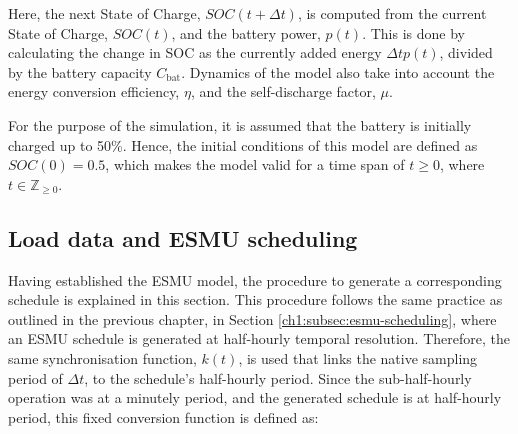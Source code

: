 %
%
%
%
%
%



Here, the next State of Charge, $SOC(t+\Delta t)$, is computed from the current State of Charge, $SOC(t)$, and the battery power, $p(t)$.
This is done by calculating the change in SOC as the currently added energy $\Delta t p(t)$, divided by the battery capacity $C_\text{bat}$.
Dynamics of the model also take into account the energy conversion efficiency, $\eta$, and the self-discharge factor, $\mu$.

For the purpose of the simulation, it is assumed that the battery is initially charged up to 50\%.
Hence, the initial conditions of this model are defined as $SOC(0) = 0.5$, which makes the model valid for a time span of $t \geq 0$, where $t \in \mathbb{Z}_{\geq0}$.

\subsection{Load data and ESMU scheduling}


Having established the ESMU model, the procedure to generate a corresponding schedule is explained in this section.
This procedure follows the same practice as outlined in the previous chapter, in Section \ref{ch1:subsec:esmu-scheduling}, where an ESMU schedule is generated at half-hourly temporal resolution.
Therefore, the same synchronisation function, $k(t)$, is used that links the native sampling period of $\Delta t$, to the schedule's half-hourly period.
Since the sub-half-hourly operation was at a minutely period, and the generated schedule is at half-hourly period, this fixed conversion function is defined as:

